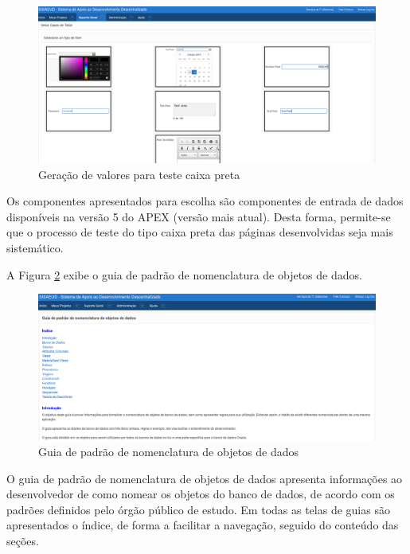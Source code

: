 \begin{figure}[!htb]
	\hspace*{-1.5cm} 
		\includegraphics[scale=0.40]{figuras/gerador_teste_p57}
	\caption{Geração de valores para teste caixa preta}
	\label{gerar_teste_sisadd}
\end{figure}

Os componentes apresentados para escolha são componentes de entrada de dados disponíveis na versão 5 do APEX (versão mais atual). Desta forma, permite-se que o processo de teste do tipo caixa preta das páginas desenvolvidas seja mais sistemático.

A Figura \ref{guia_padrao_bd_sisadd} exibe o guia de padrão de nomenclatura de objetos de dados.

\begin{figure}[!htb]
	\hspace*{-1.5cm} 
		\includegraphics[scale=0.40]{figuras/guia_nomenclatura_bd_p54}
	\caption{Guia de padrão de nomenclatura de objetos de dados}
	\label{guia_padrao_bd_sisadd}
\end{figure}

O guia de padrão de nomenclatura de objetos de dados apresenta informações ao desenvolvedor de como nomear os objetos do banco de dados, de acordo com os padrões definidos pelo órgão público de estudo. Em todas as telas de guias são apresentados o índice, de forma a facilitar a navegação, seguido do conteúdo das seções.

